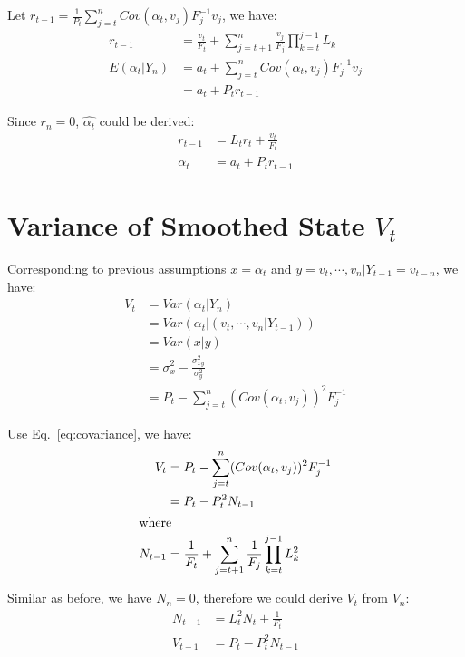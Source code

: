 \documentclass{article}
\begin{document}
\par\noindent
Let \(r_{t-1} =\frac{1}{P_t}\sum_{j=t}^{n}Cov(\alpha_{t}, v_{j})F_{j}^{-1}v_{j}\), we have:
\begin{align}
    r_{t-1} &=\frac{v_t}{F_t} + \sum_{j=t+1}^{n}\frac{v_{j}}{F_{j}}\prod_{k=t}^{j-1}L_k\\
    E(\alpha_{t}|Y_{n}) &= a_t + \sum_{j=t}^{n}Cov(\alpha_{t}, v_{j})F_{j}^{-1}v_{j}\\
    &= a_t + P_t r_{t-1}
\end{align}

\par\noindent
Since \(r_n = 0\), \(\hat{\alpha_t}\) could be derived:
\begin{align}
    r_{t-1} &= L_tr_t + \frac{v_t}{F_t}\\
    \hat{\alpha_t} &= a_t  + P_tr_{t-1}
\end{align}

\section{Variance of Smoothed State \(V_t\)}

Corresponding to previous assumptions \(x = \alpha_{t}\) and \(y = v_t, \cdots, v_n | Y_{t-1} = v_{t-n} \), we have:
\begin{align}
    V_t &= Var(\alpha_{t}|Y_{n})\\
    &= Var(\alpha_{t} | (v_t, \cdots, v_n | Y_{t-1}))\\
    &= Var(x|y)\\
    &= \sigma_{x}^2 - \frac{\sigma_{xy}^2}{\sigma_{y}^2}\\
    &= P_t - \sum_{j=t}^{n}(Cov(\alpha_{t}, v_{j}))^2 F_{j}^{-1}
\end{align}

\par\noindent
Use Eq.~\ref{eq:covariance}, we have:
\begin{align}
    V_t &= P_t - \sum_{j=t}^{n}(Cov(\alpha_{t}, v_{j}))^2 F_{j}^{-1}\\
    &= P_t - P_t^2N_{t-1}\\
\intertext{where} N_{t-1} &= \frac{1}{F_t} + \sum_{j=t+1}^{n}\frac{1}{F_{j}}\prod_{k=t}^{j-1}L_k^2
\end{align}
\par\noindent
Similar as before, we have  \(N_n = 0\), therefore we could derive \(V_t\) from \(V_n\):
\begin{align}
     N_{t-1} &= L_t^2N_t + \frac{1}{F_t}\\
     V_{t-1} &= P_t - P_t^2N_{t-1}
\end{align}
\end{document}
